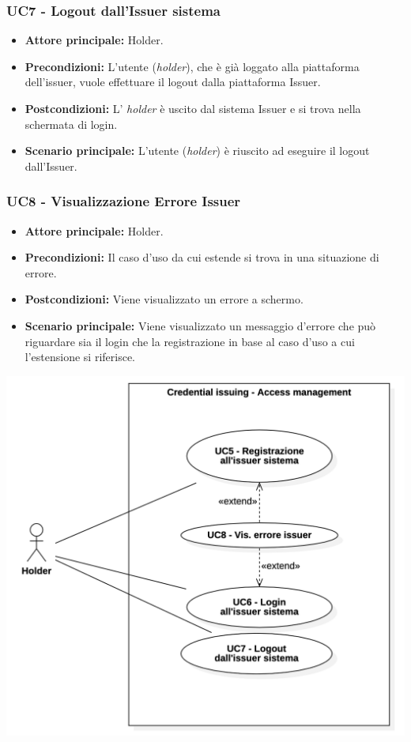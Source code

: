 \subsubsection{UC7 - Logout dall'Issuer sistema}
\begin{itemize}
\item \textbf{Attore principale:} Holder.
\item \textbf{Precondizioni:} L'utente (\textit{holder}), che è già loggato alla piattaforma dell'issuer,  vuole effettuare il logout dalla piattaforma Issuer.
\item \textbf{Postcondizioni:} L' \textit{holder} è uscito dal sistema Issuer e si trova nella schermata di login.
\item \textbf{Scenario principale:} L'utente (\textit{holder}) è riuscito ad eseguire il logout dall'Issuer. 
\end{itemize}

\subsubsection{UC8 - Visualizzazione Errore Issuer}
\begin{itemize}
\item \textbf{Attore principale:} Holder.
\item \textbf{Precondizioni:} Il caso d'uso da cui estende si trova in una situazione di errore.
\item \textbf{Postcondizioni:} Viene visualizzato un errore a schermo. 
\item \textbf{Scenario principale:} Viene visualizzato un messaggio d’errore che può riguardare sia il login che la registrazione in base al caso d’uso a cui l’estensione si riferisce.
\end{itemize}

\begin{center}
    \includegraphics[scale = 0.3]{./res/img/2Credential issuing.png}
  \end{center}


